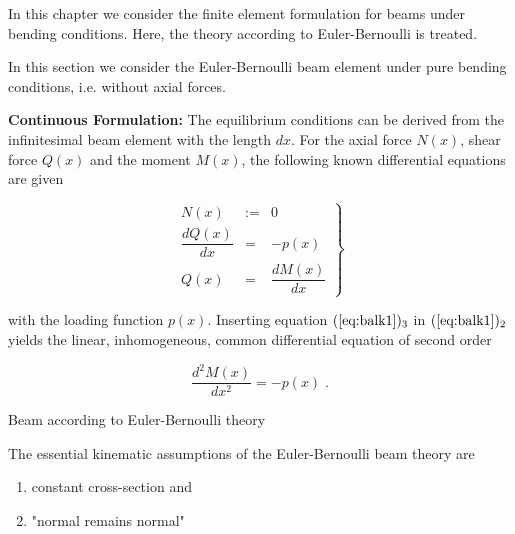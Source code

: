 \label{Section42}

In this chapter we consider the finite element formulation 
for beams under bending conditions. 
Here, the theory according to Euler-Bernoulli is treated.


In this section we consider the Euler-Bernoulli beam element 
under pure bending conditions, i.e. without axial forces. 

{\bf Continuous Formulation:}
The equilibrium conditions can be derived from the 
infinitesimal beam element with the length $dx$. 
For the axial force $N(x)$, shear force $Q(x)$ and the 
moment $M(x)$, the following known differential equations 
are given

\begin{equation}
\renewcommand{\arraystretch}{1.5}
\left.
\begin{array}{rcl}
N(x) & := & 0 \\
\dfrac{d Q(x)}{dx} & = & - p(x) \\
Q(x) & = & \dfrac{d M(x)}{dx}
\end{array}
\right\}
\label{eq:balk1}
\end{equation}

with the loading function $p(x)$. Inserting equation
$(\ref{eq:balk1})_3$ in $(\ref{eq:balk1})_2$ yields the linear,
inhomogeneous, common differential equation of second order

\begin{equation}
\dfrac{d^2 M(x)}{dx^2} = - p(x) \; .
\end{equation}

\begin{Figure}[htb]
\begin{center}

\setlength{\baselineskip}{11pt}
\caption{Beam according to Euler-Bernoulli theory}
\label{figbiege1}
\end{center}
\end{Figure}%

The essential kinematic assumptions of the Euler-Bernoulli 
beam theory are 

\begin{enumerate}
\item constant cross-section and
\item "normal remains normal"
\end{enumerate}

